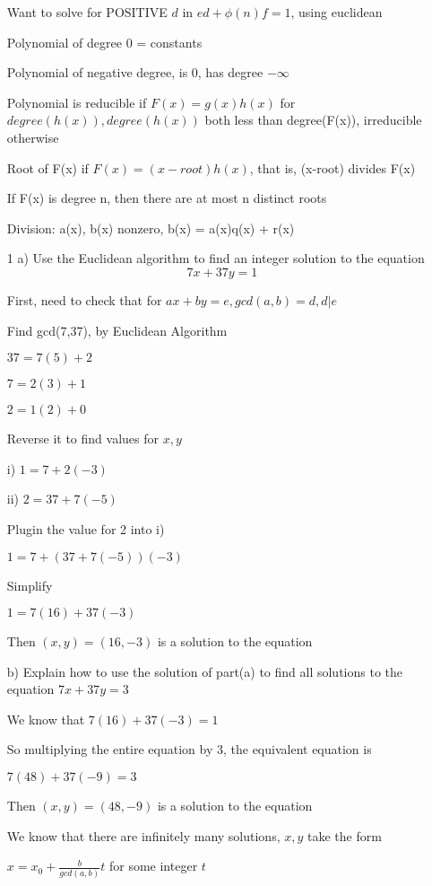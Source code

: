 \documentclass[11pt]{article}
\begin{document}
\begin{itemize}
  Want to solve for POSITIVE $d$ in $ed + \phi(n)f = 1$, using euclidean

  Polynomial of degree 0 = constants

  Polynomial of negative degree, is 0, has degree $-\infty$

  Polynomial is reducible if $F(x) = g(x)h(x)$ for $degree(h(x)), degree(h(x))$ both less than degree(F(x)), irreducible otherwise

  Root of F(x) if $F(x) = (x - root)h(x)$, that is, (x-root) divides F(x)

  If F(x) is degree n, then there are at most n distinct roots

  Division: a(x), b(x) nonzero, b(x) = a(x)q(x) + r(x)

  \newpage

\item[1]
  a) Use the Euclidean algorithm to find an integer solution to the equation $$7x + 37y = 1$$

  First, need to check that for $ax + by = e, gcd(a,b) = d, d|e$

  Find gcd(7,37), by Euclidean Algorithm

  $37 = 7(5) + 2$

  $7 = 2(3) + 1$

  $2 = 1(2) + 0$

  Reverse it to find values for $x,y$

  i) $1 = 7 + 2(-3)$

  ii) $2 = 37 + 7(-5)$

  Plugin the value for 2 into i)

  $1 = 7 + (37 + 7(-5))(-3)$

  Simplify

  $1 = 7(16) + 37(-3)$

  Then $(x,y) = (16,-3)$ is a solution to the equation

  b) Explain how to use the solution of part(a) to find all solutions to the equation $7x + 37y = 3$

  We know that $7(16) + 37(-3) = 1$

  So multiplying the entire equation by 3, the equivalent equation is

  $7(48) + 37(-9) = 3$

  Then $(x,y) = (48, -9)$ is a solution to the equation

  We know that there are infinitely many solutions, $x,y$ take the form

  $x = x_0 + \frac{b}{gcd(a,b)} t$ for some integer $t$


\end{itemize}
\end{document}
